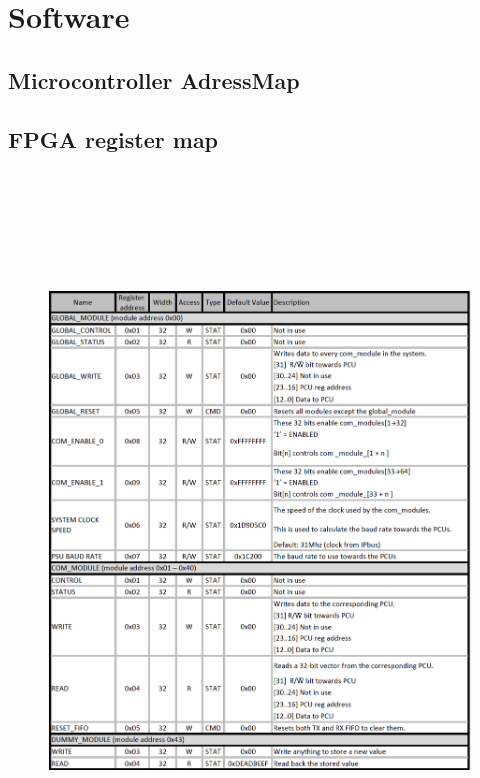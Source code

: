 \documentclass[main.tex]{subfiles}
\begin{document}
\appendix
\section{Software}

\subsection{Microcontroller AdressMap}
\label{appendix: register_map}




\subsection{FPGA register map}
\label{appendix: fpga_map}

\begin{figure}[!h]
    \centering
    \includegraphics[height= 19cm, width=17cm]{images/bilde.png}
\end{figure}
\FloatBarrier
\newpage
\end{document}
